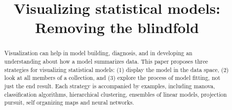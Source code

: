 \documentclass[preprint]{imsart}
\begin{document}
\begin{frontmatter}
\title{Visualizing statistical models: Removing the blindfold}


\begin{abstract}
  Visualization can help in model building, diagnosis, and in developing an
  understanding about how a model summarizes data. This paper proposes three
  strategies for visualizing statistical models: (1) display the model in the
  data space, (2) look at all members of a collection, and (3) explore the
  process of model fitting, not just the end result. Each strategy is
  accompanied by examples, including {\sc manova}, classification algorithms,
  hierarchical clustering, ensembles of linear models, projection pursuit,
  self organizing maps and neural networks.
\end{abstract}


\begin{keyword}
\end{keyword}

\end{frontmatter}
\end{document}
